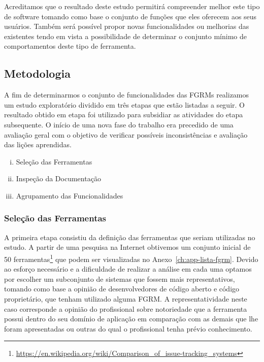 Acreditamos que o resultado deste estudo permitirá compreender melhor este tipo
de software tomando como base o conjunto de funções que eles oferecem aos seus
usuários. Também será possível propor novas funcionalidades ou melhorias das
existentes tendo em vista a possibilidade de determinar o conjunto mínimo de
comportamentos deste tipo de ferramenta.

\subsection{Metodologia}
\label{subsec:metodologia}

A fim de determinarmos o conjunto de funcionalidades das FGRMs realizamos um
estudo exploratório dividido em três etapas que estão listadas a seguir. O
resultado obtido em etapa foi utilizado para subsidiar as atividades do etapa
subsequente. O início de uma nova fase do trabalho era precedido de uma
avaliação geral com o objetivo de verificar possíveis inconsistências e
avaliação das lições aprendidas.

\begin{enumerate}[(i)]
	\item Seleção das Ferramentas
	\item Inspeção da Documentação
	\item Agrupamento das Funcionalidades
\end{enumerate}

\subsubsection{Seleção das Ferramentas}
\label{subsubsec:selecao-ferramentas}

A primeira etapa consistiu da definição das ferramentas que seriam utilizadas no
estudo. A partir de uma pesquisa na Internet obtivemos um conjunto inicial de 50
ferramentas\footnote{\url{https://en.wikipedia.org/wiki/Comparison_of_issue-tracking_systems}}
que podem ser visualizadas no Anexo~\ref{ch:app-lista-fgrm}. Devido ao esforço
necessário e a dificuldade de realizar a análise em cada uma optamos por
escolher um subconjunto de sistemas que fossem mais representativos, tomando
como base a opinião de desenvolvedores de código aberto e código proprietário,
que tenham utilizado alguma FGRM\@. A representatividade neste caso corresponde
a opinião do profissional sobre notoriedade que a ferramenta possui dentro do
seu domínio de aplicação em comparação com as demais que lhe foram apresentadas
ou outras do qual o profissional tenha prévio conhecimento.


